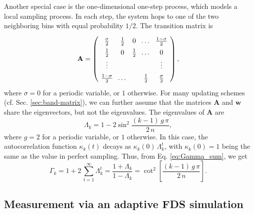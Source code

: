 \documentclass[reprint, floatfix]{revtex4-1}
\begin{document}
Another special case is the
one-dimensional one-step process\cite{vankampen},
which models a local sampling process.
In each step, the system hops to
one of the two neighboring bins
with equal probability $1/2$.
%
The transition matrix is
%
\begin{equation}
  \arraycolsep=3.6pt\def\arraystretch{1.4}
  \mathbf A
  =
  \left(
    \begin{array}{cccccccc}
      \frac \sigma 2 & \frac 1 2 & 0 & \dots & \frac {1 - \sigma} 2 \\
      \frac 1 2 & 0         & \frac 1 2 & \dots & 0 \\
      \vdots & &  & & \vdots \\
      \frac {1 - \sigma} 2 & \dots &  & \frac 1 2 & \frac \sigma 2
    \end{array}
  \right),
\notag
\end{equation}
%
where $\sigma = 0$ for a periodic variable, or $1$ otherwise.
%
For many updating schemes
(cf. Sec. \ref{sec:band-matrix}),
we can further assume that
the matrices $\mathbf A$ and $\mathbf w$
share the eigenvectors, but not the eigenvalues.
%
The eigenvalues of $\mathbf A$ are
$$
\Lambda_k
=
1 -
2 \sin^2 \frac{ (k - 1) \, g \, \pi }
              {       2 \, n        }
,
$$
where
$g = 2$ for a periodic variable, or $1$ otherwise.
%
In this case,
the autocorrelation function $\kappa_k(t)$
decays as $\kappa_k(0) \, \Lambda_k^t$,
with $\kappa_k(0) = 1$ being the same as
the value in perfect sampling.
%
Thus,
from Eq. \eqref{eq:Gamma_sum}, we get
%
\begin{equation}
  \Gamma_k
  =
  1 + 2 \, \sum_{t = 1}^\infty \Lambda_k^t
  =
  \frac{ 1 + \Lambda_k }
       { 1 - \Lambda_k }
  =
  \cot^2 \left[
    \frac{ (k - 1) \, g \, \pi }
         { 2 \, n }
  \right]
  .
\label{eq:Gamma_onestep}
\end{equation}


\subsection{\label{sec:Gamma_measure}
Measurement via an adaptive FDS simulation
}
\end{document}
